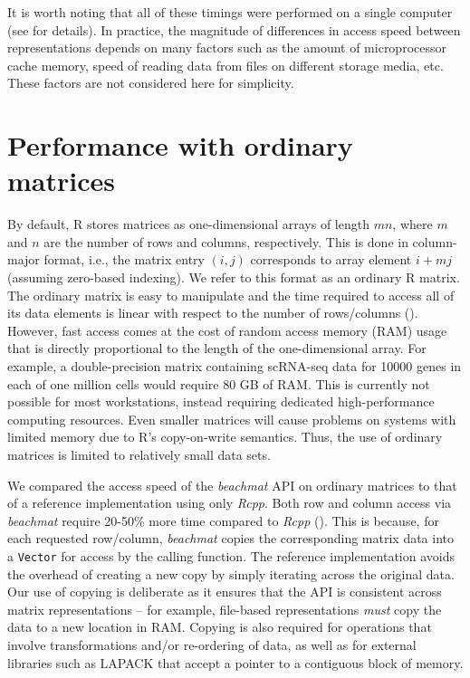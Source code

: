 \documentclass{article}
\newcommand{\beachmat}{\textit{beachmat}}
\newcommand{\code}[1]{\texttt{#1}}
\begin{document}
It is worth noting that all of these timings were performed on a single computer (see \suppsecrealsystem{} for details). 
In practice, the magnitude of differences in access speed between representations depends on many factors such as the amount of microprocessor cache memory, speed of reading data from files on different storage media, etc.
These factors are not considered here for simplicity.

\section{Performance with ordinary matrices}
By default, R stores matrices as one-dimensional arrays of length $mn$, where $m$ and $n$ are the number of rows and columns, respectively.
This is done in column-major format, i.e., the matrix entry $(i, j)$ corresponds to array element $i + mj$ (assuming zero-based indexing).
We refer to this format as an ordinary R matrix.
The ordinary matrix is easy to manipulate and the time required to access all of its data elements is linear with respect to the number of rows/columns (\suppfigsimpleaccess{}).
However, fast access comes at the cost of random access memory (RAM) usage that is directly proportional to the length of the one-dimensional array.
For example, a double-precision matrix containing scRNA-seq data for 10000 genes in each of one million cells would require 80 GB of RAM.
This is currently not possible for most workstations, instead requiring dedicated high-performance computing resources.
Even smaller matrices will cause problems on systems with limited memory due to R's copy-on-write semantics.
Thus, the use of ordinary matrices is limited to relatively small data sets.


We compared the access speed of the \beachmat{} API on ordinary matrices to that of a reference implementation using only \textit{Rcpp}.
Both row and column access via \beachmat{} require 20-50\% more time compared to \textit{Rcpp} (\suppfigsimpleaccess{}).
This is because, for each requested row/column, \beachmat{} copies the corresponding matrix data into a \code{Vector} for access by the calling function.
The reference implementation avoids the overhead of creating a new copy by simply iterating across the original data.
Our use of copying is deliberate as it ensures that the API is consistent across matrix representations -- for example, file-based representations \textit{must} copy the data to a new location in RAM.
Copying is also required for operations that involve transformations and/or re-ordering of data, as well as for external libraries such as LAPACK that accept a pointer to a contiguous block of memory.
\end{document}
